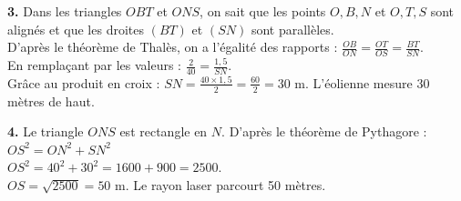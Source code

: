 \documentclass[a4paper]{book}
\begin{document}
\begin{exercice}
    \vspace{0.3cm}
    \textbf{3.} Dans les triangles $OBT$ et $ONS$, on sait que les points $O, B, N$ et $O, T, S$ sont alignés et que les droites $(BT)$ et $(SN)$ sont parallèles.\\
    D'après le théorème de Thalès, on a l'égalité des rapports : $\frac{OB}{ON} = \frac{OT}{OS} = \frac{BT}{SN}$.\\
    En remplaçant par les valeurs : $\frac{2}{40} = \frac{1,5}{SN}$.\\
    Grâce au produit en croix : $SN = \frac{40 \times 1,5}{2} = \frac{60}{2} = 30$ m. L'éolienne mesure 30 mètres de haut.
    
    \vspace{0.3cm}
    \textbf{4.} Le triangle $ONS$ est rectangle en $N$. D'après le théorème de Pythagore : \\
    $OS^2 = ON^2 + SN^2$ \\
    $OS^2 = 40^2 + 30^2 = 1600 + 900 = 2500$. \\
    $OS = \sqrt{2500} = 50$ m. Le rayon laser parcourt 50 mètres.
\end{exercice}
\end{document}
